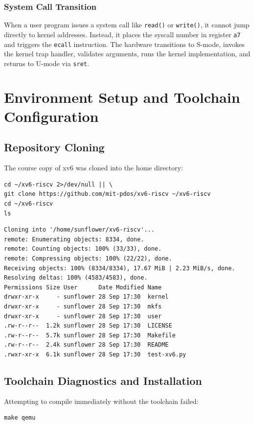 \documentclass[12pt,a4paper]{article}
\begin{document}
\subsubsection{System Call Transition}
When a user program issues a system call like \texttt{read()} or \texttt{write()}, it cannot jump directly to kernel addresses. Instead, it places the syscall number in register \texttt{a7} and triggers the \texttt{ecall} instruction. The hardware transitions to S-mode, invokes the kernel trap handler, validates arguments, runs the kernel implementation, and returns to U-mode via \texttt{sret}.

\section{Environment Setup and Toolchain Configuration}

\subsection{Repository Cloning}
The course copy of xv6 was cloned into the home directory:
\begin{lstlisting}[style=bashstyle]
cd ~/xv6-riscv 2>/dev/null || \
git clone https://github.com/mit-pdos/xv6-riscv ~/xv6-riscv
cd ~/xv6-riscv
ls
\end{lstlisting}

\begin{lstlisting}[style=consolestyle]
Cloning into '/home/sunflower/xv6-riscv'...
remote: Enumerating objects: 8334, done.
remote: Counting objects: 100% (33/33), done.
remote: Compressing objects: 100% (22/22), done.
Receiving objects: 100% (8334/8334), 17.67 MiB | 2.23 MiB/s, done.
Resolving deltas: 100% (4583/4583), done.
Permissions Size User      Date Modified Name
drwxr-xr-x     - sunflower 28 Sep 17:30  kernel
drwxr-xr-x     - sunflower 28 Sep 17:30  mkfs
drwxr-xr-x     - sunflower 28 Sep 17:30  user
.rw-r--r--  1.2k sunflower 28 Sep 17:30  LICENSE
.rw-r--r--  5.7k sunflower 28 Sep 17:30  Makefile
.rw-r--r--  2.4k sunflower 28 Sep 17:30  README
.rwxr-xr-x  6.1k sunflower 28 Sep 17:30  test-xv6.py
\end{lstlisting}

\subsection{Toolchain Diagnostics and Installation}
Attempting to compile immediately without the toolchain failed:
\begin{lstlisting}[style=bashstyle]
make qemu
\end{lstlisting}
\end{document}
